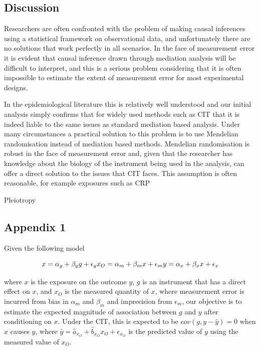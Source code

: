 \documentclass[]{article}
\begin{document}
\subsection{Discussion}\label{discussion}

Researchers are often confronted with the problem of making causal
inferences using a statistical framework on observational data, and
unfortunately there are no solutions that work perfectly in all
scenarios. In the face of measurement error it is evident that causal
inference drawn through mediation analysis will be difficult to
interpret, and this is a serious problem considering that it is often
impossible to estimate the extent of measurement error for most
experimental designs.

In the epidemiological literature this is relatively well understood and
our initial analysis simply confirms that for widely used methods such
as CIT that it is indeed liable to the same issues as standard mediation
based analysis. Under many circumstances a practical solution to this
problem is to use Mendelian randomisation instead of mediation based
methods. Mendelian randomisation is robust in the face of measurement
error and, given that the researcher has knowledge about the biology of
the instrument being used in the analysis, can offer a direct solution
to the issues that CIT faces. This assumption is often reasonable, for
example exposures such as CRP

Pleiotropy

\subsection{Appendix 1}\label{appendix-1}

Given the following model

\[
x = \alpha_g + \beta_g g + \epsilon_g \\
x_O = \alpha_m + \beta_m x + \epsilon_m \\
y = \alpha_x + \beta_x x + \epsilon_x
\]

where \(x\) is the exposure on the outcome \(y\), \(g\) is an instrument
that has a direct effect on \(x\), and \(x_O\) is the measured quantity
of \(x\), where measurement error is incurred from bias in \(\alpha_m\)
and \(\beta_m\) and imprecision from \(\epsilon_m\), our objective is to
estimate the expected magnitude of association between \(g\) and \(y\)
after conditioning on \(x\). Under the CIT, this is expected to be
\(cov(g, y - \hat{y}) = 0\) when \(x\) causes \(y\), where
\(\hat{y} = \hat{a}_{x_O} + \hat{b}_{x_O} x_O + \epsilon_{x_O}\) is the
predicted value of \(y\) using the measured value of \(x_O\).
\end{document}
